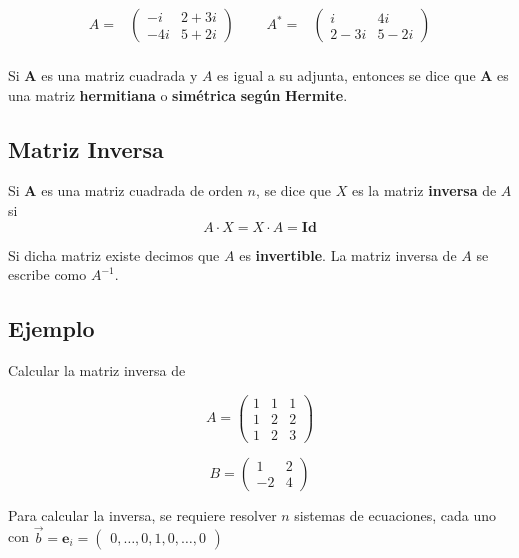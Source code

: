 \documentclass[
]{article}
\begin{document}
\begin{equation*}
\begin{array}{ccccc}
A = & \begin{pmatrix} -i & 2 + 3i  \\ -4i & 5+2i \end{pmatrix} &\,\,\,\, & A^{*} = & \begin{pmatrix} i & 4i  \\ 2-3i & 5-2i \end{pmatrix}  \\
\end{array}
\end{equation*}

Si \(\mathbf{A}\) es una matriz cuadrada y \(A\) es igual a su adjunta,
entonces se dice que \(\mathbf{A}\) es una matriz \textbf{hermitiana} o
\textbf{simétrica} \textbf{según} \textbf{Hermite}.

\hypertarget{matriz-inversa}{%
\subsection{Matriz Inversa}\label{matriz-inversa}}

\small

Si \(\mathbf{A}\) es una matriz cuadrada de orden \(n\), se dice que
\(X\) es la matriz \textbf{inversa} de \(A\) si \[
A\cdot X = X\cdot A = \mathbf{Id}
\]

Si dicha matriz existe decimos que \(A\) es \textbf{invertible}. La
matriz inversa de \(A\) se escribe como \(A^{-1}\).

\hypertarget{ejemplo-3}{%
\subsection{Ejemplo}\label{ejemplo-3}}

Calcular la matriz inversa de

\[
A =  \begin{pmatrix} 1 & 1 & 1  \\ 1 & 2 & 2 \\ 1 & 2 & 3 \end{pmatrix}
\]

\[
B =  \begin{pmatrix} 1 & 2 \\ -2 & 4  \end{pmatrix}
\]

Para calcular la inversa, se requiere resolver \(n\) sistemas de
ecuaciones, cada uno con
\(\vec{b}=\mathbf{e}_i=\begin{pmatrix} 0, \ldots,0,1,0,\ldots,0 \end{pmatrix}\)
\end{document}

